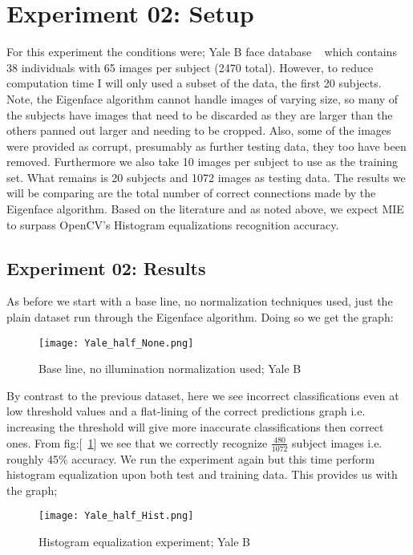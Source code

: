 \section{Experiment 02: Setup}
For this experiment the conditions were; Yale B face database ~\cite{KCLee05} which contains 38 individuals with 65 images per 
subject (2470 total).  However, to reduce computation time I will only used a subset of the data, the first 20 subjects. Note, 
the Eigenface algorithm cannot handle images of varying size,  so many of the subjects have images that need to be discarded as 
they are larger than the others panned out larger and needing to be cropped.  Also, some of the images were provided as corrupt, 
presumably as further testing data, they too have been removed.  Furthermore we also take 10 images per subject to use as the 
training set.  What remains is 20 subjects and 1072 images as testing data.  The results we will be comparing are the total number 
of correct connections made by the Eigenface algorithm.  Based on the literature and as noted above, we expect MIE to surpass 
OpenCV's Histogram equalizations recognition accuracy.

\subsection{Experiment 02: Results}
As before we start with a base line, no normalization techniques used, just the plain dataset run through the 
Eigenface algorithm.  Doing so we get the graph:

	\begin{figure}[H]
		\centering
		\caption{Base line, no illumination normalization used; Yale B\label{fig:BaseLine}}
		\texttt{[image: Yale\_half\_None.png]}
	\end{figure}
By contrast to the previous dataset, here we see incorrect classifications even at low threshold values and a flat-lining of 
the correct predictions graph i.e. increasing the threshold will give more inaccurate classifications then correct ones.
From fig:[~\ref{fig:BaseLine}] we see that we correctly recognize $\frac{480}{1072}$ subject images i.e. roughly 45\% 
accuracy.  We run the experiment again but this time perform histogram equalization upon both test and training data.  
This provides us with the graph; 

	\begin{figure}[H]
		\centering
		\caption{Histogram equalization experiment; Yale B \label{fig:Hist_exp}}
		\texttt{[image: Yale\_half\_Hist.png]}
	\end{figure}
	
